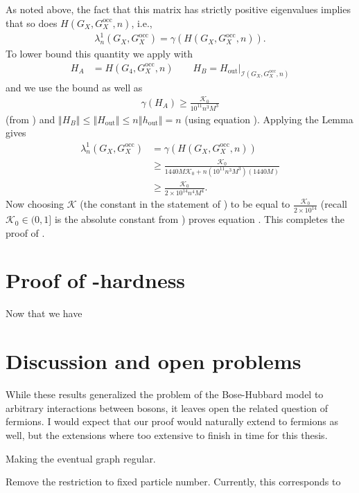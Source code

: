 \documentclass[../thesis-main/thesis-main]{subfiles}
\begin{document}
As noted above, the fact that this matrix has strictly positive eigenvalues implies that so does
$H(G_{X},G_X^{\text{occ}},n)$, i.e.,
\begin{align}
\lambda_{n}^{1}\left(G_{X},G_X^{\text{occ}}\right)=\gamma(H(G_{X},G_X^{\text{occ}},n)).
\end{align}
To lower bound this quantity we apply  with
\begin{align}
H_{A} &= H(G_{4},G_X^{\text{occ}},n)\qquad H_{B}=H_{{\text{out}}}\big|_{\mathcal{I}(G_{X},G_X^{\text{occ}},n)}
\end{align}
and we use the bound  as well as
\begin{align}
\gamma(H_{A}) \geq \frac{\mathcal{K}_0}{10^{11} n^{3}M^{3}}
\end{align}
(from ) and $\left\Vert H_{B}\right\Vert \leq\left\Vert H_{{\text{out}}}\right\Vert \leq n\left\Vert h_{{\text{out}}}\right\Vert=n$ (using equation ). Applying the Lemma gives
\begin{align}
\lambda_{n}^{1}\left(G_{X},G_X^{\text{occ}}\right)&=\gamma(H(G_{X},G_X^{\text{occ}},n))\\
&\geq \frac{\mathcal{K}_0}{1440M \mathcal{K}_0+n(10^{11}n^3M^3)(1440M)}\\
&\geq \frac{\mathcal{K}_0}{2\times10^{14}n^4M^4}.
\end{align}
Now choosing $\mathcal{K}$ (the constant in the statement of ) to be equal to $\frac{\mathcal{K}_0}{2\times10^{14}}$ (recall $\mathcal{K}_0\in (0,1]$ is the absolute constant from ) proves equation . This completes the proof of .

\section{Proof of \QMA-hardness}

Now that we have 


\section{Discussion and open problems}

While these results generalized the problem of the Bose-Hubbard model to arbitrary interactions between bosons, it leaves open the related question of fermions.  I would expect that our proof would naturally extend to fermions as well, but the extensions where too extensive to finish in time for this thesis.

Making the eventual graph regular.

Remove the restriction to fixed particle number.  Currently, this corresponds to 

\biblio
\end{document}
